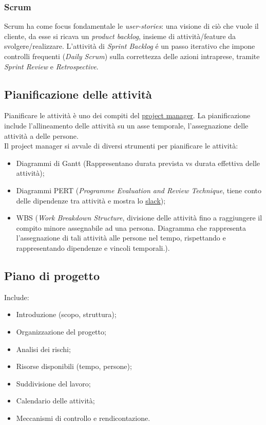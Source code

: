 			\subsubsection{Scrum}
				Scrum ha come focus fondamentale le  \emph{user-stories}: una visione di ciò che vuole il cliente, da esse si ricava un \emph{product backlog}, insieme di attività/feature da svolgere/realizzare. L'attività di \emph{Sprint Backlog} é un passo iterativo che impone controlli frequenti (\emph{Daily Scrum}) sulla correttezza delle azioni intraprese, tramite \emph{Sprint Review} e \emph{Retrospective}.\newpage


	\subsection{Pianificazione delle attività}	
	\label{sec:pianificazioneattivita}
	Pianificare le attività è uno dei compiti del \underline{\hyperref[sec:projectmanager]{project manager}}.
	La pianificazione include l'allineamento delle attività su un asse temporale, l'assegnazione delle attività a delle persone. \\Il project manager si avvale di diversi strumenti per pianificare le attività:  	
	\begin{itemize}  
	\item Diagrammi di Gantt (Rappresentano durata prevista vs durata effettiva delle attività);
	\item Diagrammi PERT (\emph{Programme Evaluation and Review Technique}, tiene conto delle dipendenze tra attività e mostra lo \hyperref[sec:slack]{slack});
	\item WBS (\emph{Work Breakdown Structure}, divisione delle attività fino a raggiungere il compito minore assegnabile ad una persona. Diagramma che rappresenta l'assegnazione di tali attività alle persone nel tempo, rispettando e rappresentando dipendenze e vincoli temporali.).
	\end{itemize}	
	
	\subsection{Piano di progetto}	
	\label{sec:pianoprogetto}
	Include:
	\begin{itemize}  
	\item Introduzione (scopo, struttura);
	\item Organizzazione del progetto;
	\item Analisi dei rischi;
	\item Risorse disponibili (tempo, persone);
	\item Suddivisione del lavoro;
	\item Calendario delle attività;
	\item Meccanismi di controllo e rendicontazione.
	\end{itemize}	
		
